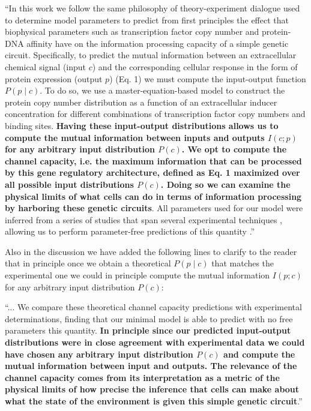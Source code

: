 ``In this work we follow the same philosophy of theory-experiment dialogue used
to determine model parameters to predict from first principles the effect that
biophysical parameters such as transcription factor copy number and protein-DNA
affinity have on the information processing capacity of a simple genetic
circuit. Specifically, to predict the mutual information between an
extracellular chemical signal (input $c$) and the corresponding cellular
response in the form of protein expression (output $p$) (Eq. 1) we must compute
the input-output function $P(p \mid c)$. To do so, we use a
master-equation-based model to construct the protein copy number distribution as
a function of an extracellular inducer concentration for different combinations
of transcription factor copy numbers and binding sites. \textbf{Having these
input-output distributions allows us to compute the mutual information between
inputs and outputs $I(c; p)$ for any arbitrary input distribution $P(c)$. We opt
to compute the channel capacity, i.e. the maximum information that can be
processed by this gene regulatory architecture, defined as Eq. 1 maximized over
all possible input distributions $P(c)$. Doing so we can examine the physical
limits of what cells can do in terms of information processing by harboring
these genetic circuits}. All parameters used for our model were inferred from a
series of studies that span several experimental techniques \cite{Garcia2011c,
Jones2014a, Brewster2014, Razo-Mejia2018}, allowing us to perform parameter-free
predictions of this quantity \cite{Phillips2019}.''

Also in the discussion we have added the following lines to clarify to the
reader that in principle once we obtain a theoretical $P(p \mid c)$ that matches
the experimental one we could in principle compute the mutual information
$I(p ; c)$ for any arbitrary input distribution $P(c)$:

``... We compare these theoretical channel capacity predictions with
experimental determinations, finding that our minimal model is able to predict
with no free parameters this quantity. \textbf{In principle since our predicted
input-output distributions were in close agreement with experimental data we
could have chosen any arbitrary input distribution $P(c)$ and compute the mutual
information between input and outputs. The relevance of the channel capacity
comes from its interpretation as a metric of the physical limits of how precise
the inference that cells can make about what the state of the environment is
given this simple genetic circuit}.''

